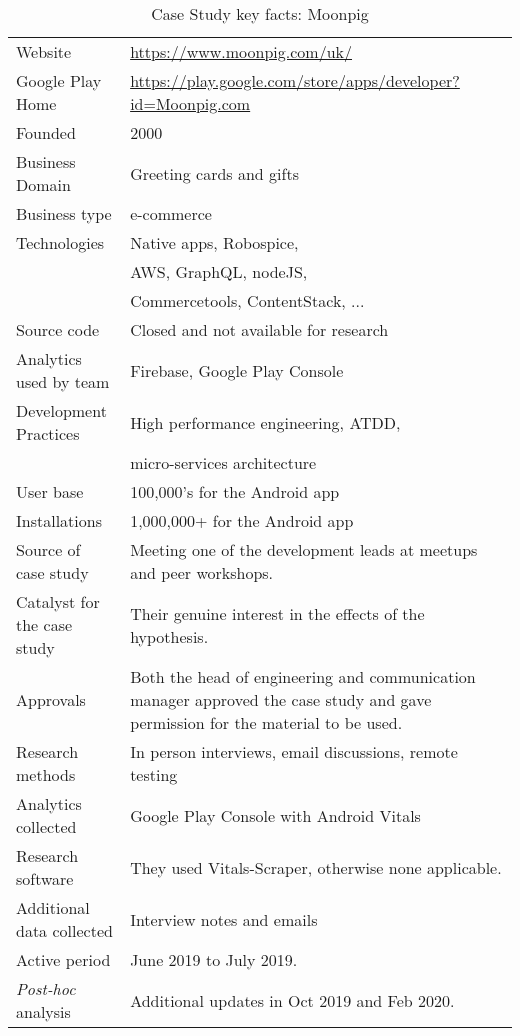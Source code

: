 {\renewcommand{\arraystretch}{0.8}%
\begin{table*}
    \centering
    \small
    \setlength{\tabcolsep}{6pt}
    \begin{tabular}{lp{9cm}}
       \toprule
       Website &\url{https://www.moonpig.com/uk/} \\
       Google Play Home & \url{https://play.google.com/store/apps/developer?id=Moonpig.com} \\
       Founded &2000 \\
       Business Domain & Greeting cards and gifts \\
       Business type & e-commerce \\
       Technologies  & Native apps, Robospice, \\
       & AWS, GraphQL, nodeJS, \\
       & Commercetools, ContentStack, ... \\
       Source code  &Closed and not available for research \\
       Analytics used by team &Firebase, Google Play Console \\
       Development Practices & High performance engineering, ATDD, \\
         & micro-services architecture \\
       \midrule
       User base &100,000's for the Android app\\
       Installations &1,000,000+ for the Android app\\
       \midrule
       Source of case study &Meeting one of the development leads at meetups and peer workshops. \\
       Catalyst for the case study & Their genuine interest in the effects of the hypothesis. \\
       Approvals &Both the head of engineering and communication manager approved the case study and gave permission for the material to be used. \\
       \midrule
       Research methods &In person interviews, email discussions, remote testing \\
       Analytics collected &Google Play Console with Android Vitals \\
       Research software &They used Vitals-Scraper, otherwise none applicable.\\
       Additional data collected &Interview notes and emails \\
       Active period &June 2019 to July 2019. \\
       \midrule
       \emph{Post-hoc} analysis & Additional updates in Oct 2019 and Feb 2020. \\
       \bottomrule
    \end{tabular}
    \caption{Case Study key facts: Moonpig}
    \label{tab:moonpig_anaytics_overview}
\end{table*}
}

